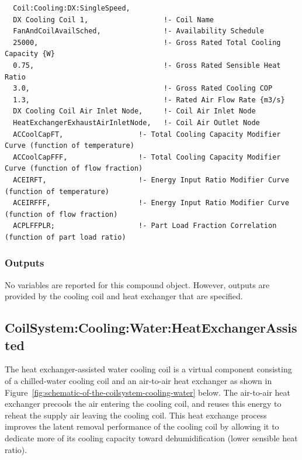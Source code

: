 \begin{lstlisting}
  Coil:Cooling:DX:SingleSpeed,
  DX Cooling Coil 1,                  !- Coil Name
  FanAndCoilAvailSched,               !- Availability Schedule
  25000,                              !- Gross Rated Total Cooling Capacity {W}
  0.75,                               !- Gross Rated Sensible Heat Ratio
  3.0,                                !- Gross Rated Cooling COP
  1.3,                                !- Rated Air Flow Rate {m3/s}
  DX Cooling Coil Air Inlet Node,     !- Coil Air Inlet Node
  HeatExchangerExhaustAirInletNode,   !- Coil Air Outlet Node
  ACCoolCapFT,                  !- Total Cooling Capacity Modifier Curve (function of temperature)
  ACCoolCapFFF,                 !- Total Cooling Capacity Modifier Curve (function of flow fraction)
  ACEIRFT,                      !- Energy Input Ratio Modifier Curve (function of temperature)
  ACEIRFFF,                     !- Energy Input Ratio Modifier Curve (function of flow fraction)
  ACPLFFPLR;                    !- Part Load Fraction Correlation (function of part load ratio)
\end{lstlisting}

\subsubsection{Outputs}\label{outputs-21}

No variables are reported for this compound object. However, outputs are provided by the cooling coil and heat exchanger that are specified.

\subsection{CoilSystem:Cooling:Water:HeatExchangerAssisted}\label{coilsystemcoolingwaterheatexchangerassisted}

The heat exchanger-assisted water cooling coil is a virtual component consisting of a chilled-water cooling coil and an air-to-air heat exchanger as shown in Figure~\ref{fig:schematic-of-the-coilsystem-cooling-water} below. The air-to-air heat exchanger precools the air entering the cooling coil, and reuses this energy to reheat the supply air leaving the cooling coil. This heat exchange process improves the latent removal performance of the cooling coil by allowing it to dedicate more of its cooling capacity toward dehumidification (lower sensible heat ratio).

